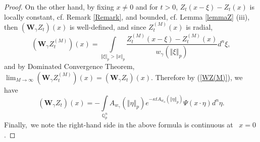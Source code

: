 \documentclass{amsart}\usepackage{amsfonts}
\theoremstyle{plain}
\numberwithin{equation}{section}
\begin{document}
\begin{proof}
On the other hand, by fixing $x\neq0$ and for $t>0$, $Z_{t}(x-\xi)-Z_{t}(x)$
is locally constant, cf. Remark \ref{Remark}, and bounded, cf. Lemma
\ref{lemmaZ} (iii), then $(\mathbf{W}_{\gamma}Z_{t})(x)$ is well-defined, and
since $Z_{t}^{(M)}\left(  x\right)  $ is radial,
\[
(\mathbf{W}_{\gamma}Z_{t}^{(M)})(x)=\underset{\left\Vert \xi\right\Vert
_{p}>\left\Vert x\right\Vert _{p}}{\int}\frac{Z_{t}^{(M)}(x-\xi)-Z_{t}^{(M)}(x)}{w_{\gamma}(\left\Vert \xi\right\Vert _{p})}d^{n}\xi,
\]
and by Dominated Convergence Theorem, $\lim_{M\rightarrow\infty}(\mathbf{W}_{\gamma}Z_{t}^{(M)})(x)=(\mathbf{W}_{\gamma}Z_{t})(x)$. Therefore
by (\ref{WZ(M)}), we have\[
(\mathbf{W}_{\gamma}Z_{t})(x)=-\underset{\mathbb{Q}_{p}^{n}}{\int}A_{w_{\gamma}}(\left\Vert \eta\right\Vert _{p})e^{-\kappa tA_{w_{\alpha}}(\left\Vert \eta\right\Vert _{p})}\Psi(x\cdot\eta)d^{n}\eta.
\]
Finally,\ we note the right-hand side in the above formula is continuous at
\ $x=0$.


\end{proof}
\end{document}
